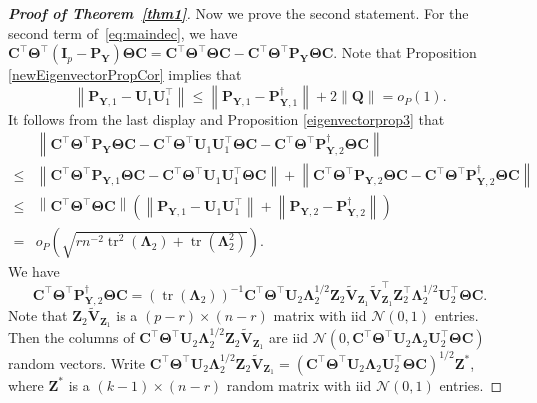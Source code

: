 \documentclass[12pt]{article} %
\DeclareMathOperator{\mytr}{tr}
\newcommand{\bQ}{\mathbf{Q}}
\newcommand{\bZ}{\mathbf{Z}}
\newcommand{\bP}{\mathbf{P}}
\newcommand{\bY}{\mathbf{Y}}
\newcommand{\bC}{\mathbf{C}}
\newcommand{\bI}{\mathbf{I}}
\newcommand{\bU}{\mathbf{U}}
\newcommand{\bV}{\mathbf{V}}
\newcommand{\bfsym}[1]{\ensuremath{\boldsymbol{#1}}}
\def\bLambda {\bfsym {\Lambda}}
\def\bTheta {\bfsym {\Theta}}
\theoremstyle{definition}
\begin{document}
\begin{appendices}
\begin{proof}[\textbf{Proof of Theorem~\ref{thm1}}]
Now we prove the second statement.
For the second term of~\eqref{eq:maindec}, we have
$
    \bC^\top \bTheta^\top (\bI_p-\bP_\bY)\bTheta \bC=
    \bC^\top \bTheta^\top\bTheta \bC-\bC^\top \bTheta^\top \bP_{\bY} \bTheta \bC
    $.
    Note that Proposition \ref{newEigenvectorPropCor} implies that
    \begin{equation*}
\left\| \bP_{\bY,1}-\bU_1\bU_1^\top\right\|
\leq
\left\| \bP_{\bY,1}-\bP_{\bY,1}^\dagger\right\|+2\left\|\bQ\right\|=o_P(1)
.
    \end{equation*}
    It follows from the last display and Proposition \ref{eigenvectorprop3} that
    \begin{equation*}
        \begin{split}
        &\left\|
        \bC^\top \bTheta^\top \bP_{\bY} \bTheta \bC
        -
        \bC^\top \bTheta^\top \bU_1 \bU_1^\top \bTheta \bC
        -
        \bC^\top \bTheta^\top \bP_{\bY,2}^\dagger \bTheta \bC
        \right\|
        \\
        \leq
        &
        \left\|
        \bC^\top \bTheta^\top \bP_{\bY,1} \bTheta \bC
        -
        \bC^\top \bTheta^\top \bU_1 \bU_1^\top  \bTheta \bC
        \right\|
        +
        \left\|
        \bC^\top \bTheta^\top \bP_{\bY,2} \bTheta \bC
        -
        \bC^\top \bTheta^\top \bP_{\bY,2}^\dagger \bTheta \bC
        \right\|
        \\
        \leq &
\left\|
        \bC^\top \bTheta^\top \bTheta \bC
\right\|
\left(
\left\| \bP_{\bY,1}-\bU_1\bU_1^\top\right\|
    +
    \left\| \bP_{\bY,2}-\bP_{\bY,2}^\dagger\right\|
\right)
\\
=&
o_P\left(
\sqrt{
        rn^{-2} \mytr^2 (\bLambda_2) + \mytr(\bLambda_2^2)
}
\right).
        \end{split}
    \end{equation*}
    We have
\begin{equation*}
        \bC^\top \bTheta^\top \bP_{\bY,2}^\dagger \bTheta \bC
        =
        \left(\mytr(\bLambda_2)\right)^{-1}
        \bC^\top \bTheta^\top \bU_2 \bLambda_2^{1/2} \bZ_{2} \tilde{\bV}_{\bZ_1}  \tilde{\bV}_{\bZ_1}^\top \bZ_2^\top \bLambda_2^{1/2} \bU_2^\top   \bTheta \bC.
\end{equation*}
Note that $\bZ_{2} \tilde{\bV}_{\bZ_1}$ is a $(p-r) \times (n-r) $ matrix with iid $\mathcal{N}(0,1)$ entries.
Then the columns of $\bC^\top \bTheta^\top \bU_2 \bLambda_2^{1/2} \bZ_{2} \tilde{\bV}_{\bZ_1}$ are iid $\mathcal{N}(0,\bC^\top \bTheta^\top \bU_2 \bLambda_2 \bU_2^\top \bTheta \bC)$ random vectors.
Write $\bC^\top \bTheta^\top \bU_2 \bLambda_2^{1/2} \bZ_{2} \tilde{\bV}_{\bZ_1}=(\bC^\top \bTheta^\top \bU_2 \bLambda_2 \bU_2^\top \bTheta \bC)^{1/2} \bZ^*$, where $\bZ^*$ is a $(k-1)\times (n-r)$ random matrix with iid $\mathcal{N}(0,1)$ entries. 

\end{proof}
\end{appendices}
\end{document}
